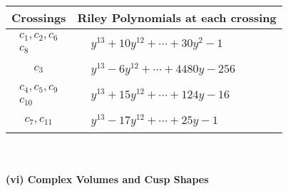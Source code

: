 \documentclass[1p]{elsarticle_modified}
\theoremstyle{definition}
\begin{document}
\begin{tabular}{m{50pt}|m{274pt}}
Crossings & \hspace{64pt}Riley Polynomials at each crossing \\
\hline $$\begin{aligned}c_{1},c_{2},c_{6}\\c_{8}\end{aligned}$$&$\begin{aligned}
&y^{13}+10 y^{12}+\cdots+30 y^2-1
\end{aligned}$\\
\hline $$\begin{aligned}c_{3}\end{aligned}$$&$\begin{aligned}
&y^{13}-6 y^{12}+\cdots+4480 y-256
\end{aligned}$\\
\hline $$\begin{aligned}c_{4},c_{5},c_{9}\\c_{10}\end{aligned}$$&$\begin{aligned}
&y^{13}+15 y^{12}+\cdots+124 y-16
\end{aligned}$\\
\hline $$\begin{aligned}c_{7},c_{11}\end{aligned}$$&$\begin{aligned}
&y^{13}-17 y^{12}+\cdots+25 y-1
\end{aligned}$\\
\hline
\end{tabular}\\~\\
\newpage\flushleft \textbf{(vi) Complex Volumes and Cusp Shapes}
\end{document}

